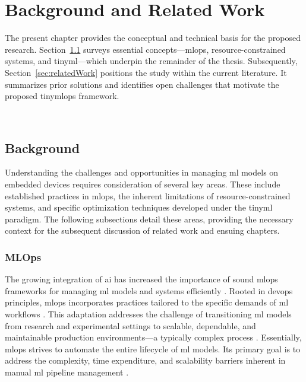 
\chapter{Background and Related Work}
\label{chp:Related_Work}

The present chapter provides the conceptual and technical basis for the proposed research. Section~\ref{sec:background_main} surveys essential concepts—\gls{mlops}, resource-constrained systems, and \gls{tinyml}—which underpin the remainder of the thesis. Subsequently, Section~\ref{sec:relatedWork} positions the study within the current literature. It summarizes prior solutions and identifies open challenges that motivate the proposed \gls{tinymlops} framework.

~\\
\vfill
\minitoc
\clearpage

\section{Background}
\label{sec:background_main}

Understanding the challenges and opportunities in managing \gls{ml} models on embedded devices requires consideration of several key areas. These include established practices in \gls{mlops}, the inherent limitations of resource-constrained systems, and specific optimization techniques developed under the \gls{tinyml} paradigm. The following subsections detail these areas, providing the necessary context for the subsequent discussion of related work and ensuing chapters.

\subsection{MLOps}
\label{subsec:mlops}

The growing integration of \gls{ai} has increased the importance of sound \gls{mlops} frameworks for managing \gls{ml} models and systems efficiently \cite{burgueno-romeroOpenSourceMLOps2025}. Rooted in \gls{devops} principles, \gls{mlops} incorporates practices tailored to the specific demands of \gls{ml} workflows \cite{johnMLOpsFrameworkMaturity2021}. This adaptation addresses the challenge of transitioning \gls{ml} models from research and experimental settings to scalable, dependable, and maintainable production environments—a typically complex process \cite{burgueno-romeroOpenSourceMLOps2025, testiMLOpsTaxonomyMethodology2022, kreuzbergerMachineLearningOperations2023}.
Essentially, \gls{mlops} strives to automate the entire lifecycle of \gls{ml} models. Its primary goal is to address the complexity, time expenditure, and scalability barriers inherent in manual \gls{ml} pipeline management \cite{burgueno-romeroOpenSourceMLOps2025, johnMLOpsFrameworkMaturity2021}.

